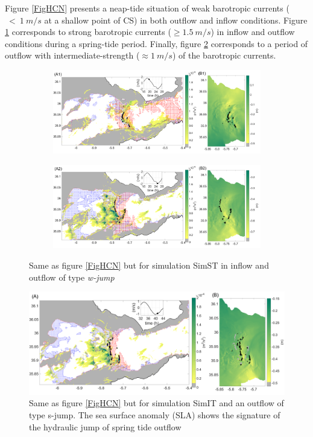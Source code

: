 Figure \ref{FigHCN} presents a neap-tide situation of weak barotropic currents ($\ <\ 1\ m/s$ at a shallow point of CS) in both outflow and inflow conditions. Figure \ref{FigHCS} corresponds to strong barotropic currents ($\geq 1.5\ m/s$) in inflow and outflow conditions during a spring-tide period. Finally, figure \ref{FigHCI} corresponds to a period of outflow with intermediate-strength ($\approx 1\ m/s$) of the barotropic currents.

\begin{figure}[!h]
 \centering
\begin{subfigure}{\linewidth}
\centering
\includegraphics[width=\linewidth]{./GBR3D/VE2_19h30_p.png}
\end{subfigure}

\begin{subfigure}{\linewidth}
\centering
\includegraphics[width=\linewidth]{./GBR3D/VE2_25h_p.png}
\end{subfigure}
\caption {Same as figure \ref{FigHCN} but for simulation SimST in inflow and outflow of type \textit{w-jump}}
\label{FigHCS}
\end{figure}

\begin{figure}[!h]
 \centering
\includegraphics[width=\linewidth]{./GBR3D/IES_41h_p.png}
 \caption {Same as figure  \ref{FigHCN} but for simulation SimIT and an outflow of type {s-jump}. The sea surface anomaly (SLA) shows the signature of the hydraulic jump of spring tide outflow}
 \label{FigHCI}
\end{figure}

